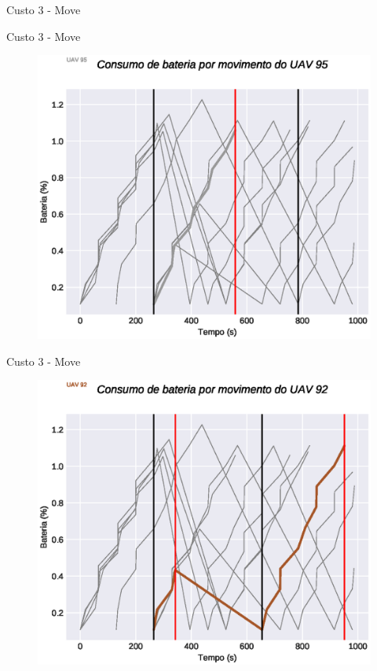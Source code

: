 \begin{frame}{Custo 3 - Move}
\begin{figure}[!htb]
                 \end{figure}
            \end{frame}\begin{frame}{Custo 3 - Move}
                \begin{figure}[!htb]
                     \includegraphics[width=\textwidth]{custo_3/uav_move_acum_uav_9.eps}
                 \end{figure}
            \end{frame}\begin{frame}{Custo 3 - Move}
                \begin{figure}[!htb]
                     \includegraphics[width=\textwidth]{custo_3/uav_move_acum_uav_6.eps}

\end{figure}
\end{frame}
